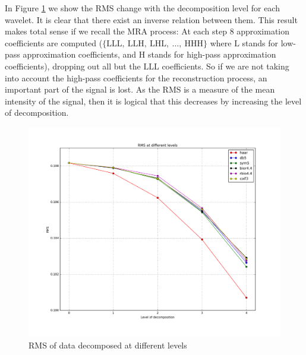 \documentclass[letter, 11pt]{article}
\begin{document}
\begin{description}
    In Figure \ref{fig:rms} we show the RMS change with the decomposition level for each wavelet. It is clear that there exist an inverse relation between them. This result makes total sense if we recall the MRA process: At each step $8$ approximation coefficients are computed ($\{ \text{LLL},\ \text{LLH},\ \text{LHL},\ \ldots,\ \text{HHH} \}$ where $\text{L}$ stands for low-pass approximation coefficients, and $\text{H}$ stands for high-pass approximation coefficients), dropping out all but the $\text{LLL}$ coefficients. So if we are not taking into account the high-pass coefficients for the reconstruction process, an important part of the signal is lost. As the RMS is a measure of the mean intensity of the signal, then it is logical that this decreases by increasing the level of decomposition.
    \begin{figure}[htpb!]
    \centering
    \includegraphics[width=12cm]{rmsgraph}
    \caption{RMS of data decomposed at different levels}
    \label{fig:rms}
    \end{figure}


\end{description}
\end{document}

